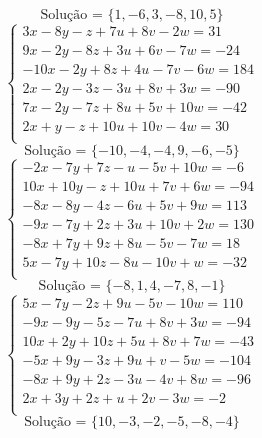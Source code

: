 \documentclass[12pt,oneside,a4paper]{article}
\begin{document}
\begin{equation*}
\text{Solução = }\{1,-6,3,-8,10,5\}
\end{equation*}
\vspace{\baselineskip}
\begin{equation*}
\begin{cases}
3x-8y-z+7u+8v-2w=31 \\
9x-2y-8z+3u+6v-7w=-24 \\
-10x-2y+8z+4u-7v-6w=184 \\
2x-2y-3z-3u+8v+3w=-90 \\
7x-2y-7z+8u+5v+10w=-42 \\
2x+y-z+10u+10v-4w=30 \\
\end{cases}
\end{equation*}
\begin{equation*}
\text{Solução = }\{-10,-4,-4,9,-6,-5\}
\end{equation*}
\vspace{\baselineskip}
\begin{equation*}
\begin{cases}
-2x-7y+7z-u-5v+10w=-6 \\
10x+10y-z+10u+7v+6w=-94 \\
-8x-8y-4z-6u+5v+9w=113 \\
-9x-7y+2z+3u+10v+2w=130 \\
-8x+7y+9z+8u-5v-7w=18 \\
5x-7y+10z-8u-10v+w=-32 \\
\end{cases}
\end{equation*}
\begin{equation*}
\text{Solução = }\{-8,1,4,-7,8,-1\}
\end{equation*}
\vspace{\baselineskip}
\begin{equation*}
\begin{cases}
5x-7y-2z+9u-5v-10w=110 \\
-9x-9y-5z-7u+8v+3w=-94 \\
10x+2y+10z+5u+8v+7w=-43 \\
-5x+9y-3z+9u+v-5w=-104 \\
-8x+9y+2z-3u-4v+8w=-96 \\
2x+3y+2z+u+2v-3w=-2 \\
\end{cases}
\end{equation*}
\begin{equation*}
\text{Solução = }\{10,-3,-2,-5,-8,-4\}
\end{equation*}
\end{document}
